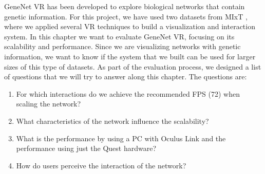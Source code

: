 


GeneNet VR has been developed to explore biological networks that contain genetic information. For this project, we have used two datasets from MIxT \cite{dumeaux_fjukstad_interactions_tumor_blood}, where we applied several VR techniques to build a visualization and interaction system. In this chapter we want to evaluate GeneNet VR, focusing on its scalability and performance. Since we are visualizing networks with genetic information, we want to know if the system that we built can be used for larger sizes of this type of datasets. As part of the evaluation process, we designed a list of questions that we will try to answer along this chapter. The questions are:
\begin{enumerate}
  \item For which interactions do we achieve the recommended FPS (72) when scaling the network?
  \item What characteristics of the network influence the scalability?
  \item What is the performance by using a PC with Oculus Link and the performance using just the Quest hardware?
  \item How do users perceive the interaction of the network?
\end{enumerate}

